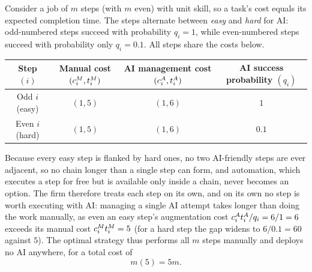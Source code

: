 \begin{example}
\label{ex:fragmentation_interleaved}
Consider a job of $m$ steps (with $m$ even) with unit skill, so a task's cost equals its expected completion time.
The steps alternate between \emph{easy} and \emph{hard} for AI: odd-numbered steps succeed with probability $q_i = 1$, while even-numbered steps succeed with probability only $q_i = 0.1$.
All steps share the costs below.
\begin{center}
\begin{tabular}{c|ccc}
\toprule
\makecell{Step\\$(i)$} & \makecell{Manual cost\\$(c^{M}_{i}, t^{M}_{i})$} & \makecell{AI management cost\\$(c^{A}_{i}, t^{A}_{i})$} & \makecell{AI success probability\\$(q_i)$} \\
\midrule
Odd $i$ (easy) & $(1, 5)$ & $(1, 6)$ & $1$ \\
Even $i$ (hard) & $(1, 5)$ & $(1, 6)$ & $0.1$ \\
\bottomrule
\end{tabular}
\end{center}

\vspace{0.25cm}



Because every easy step is flanked by hard ones, no two AI-friendly steps are ever adjacent, so no chain longer than a single step can form, and automation, which executes a step for free but is available only inside a chain, never becomes an option.
The firm therefore treats each step on its own, and on its own no step is worth executing with AI: managing a single AI attempt takes longer than doing the work manually, as even an easy step's augmentation cost $c^{A}_{i}t^{A}_{i}/q_i = 6/1 = 6$ exceeds its manual cost $c^{M}_{i}t^{M}_{i} = 5$ (for a hard step the gap widens to $6/0.1 = 60$ against $5$).
The optimal strategy thus performs all $m$ steps manually and deploys no AI anywhere, for a total cost of
\[
m(5) = 5m.
\]
\end{example}
